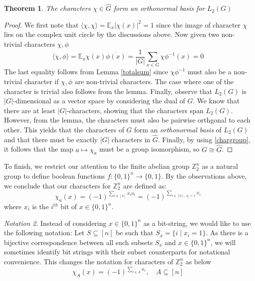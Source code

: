\documentclass{amsart}
\newtheorem{theorem}{Theorem}[section]
\theoremstyle{definition}
\theoremstyle{remark}
\numberwithin{equation}{section}
\theoremstyle{remark}
\newtheorem{notation}[theorem]{Notation}
\begin{document}
\begin{theorem} \label{orthonormal}
  The characters $\chi \in \hat{G}$ form an orthonormal basis for $L_2(G)$
\end{theorem}
%
\begin{proof}
We first note that $\langle \chi, \chi \rangle = \mathbb{E}_x|\chi(x)|^2 = 1$ since the image of character $\chi$ lies on the complex unit circle by the discussions above. Now given two non-trivial characters $\chi, \phi$
$$ \langle \chi, \phi \rangle = \mathbb{E}_x \chi(x)\overline{\phi(x)} = \frac{1}{|G|} \sum_{x \in G} \chi\phi^{-1}(x)  = 0$$
The last equality follows from Lemma \ref{totalsum} since $\chi\phi^{-1}$ must also be a non-trivial character if $\chi, \phi$ are non-trivial characters. The case where one of the character is trivial also follows from the lemma.
Finally, observe that $L_2(G)$ is $|G|$-dimensional as a vector space by considering the dual of $G$. We know that there are at least $|G|$-characters, showing that the characters span $L_2(G)$. However, from the lemma, the characters must also be pairwise orthgonal to each other. This yields that the characters of $G$ form an \emph{orthonormal basis} of $L_2(G)$ and that there must be exactly $|G|$ characters in $\hat{G}$. Finally, by using \ref{chargroup}, it follows that the map $a \mapsto \chi_a$ must be a group isomorphism, so $G \cong \hat{G}$.
\end{proof}

To finish, we restrict our attention to the finite abelian group $\mathbb{Z}_2^n$ as a natural group to define boolean functions $f: \{0,1\}^n \rightarrow \{0,1\}$. By the observations above, we conclude that our characters for $\mathbb{Z}_2^n$ are defined as:
%
\begin{equation}
  \chi_a(x) = (-1)^{\sum_{i \in [n]} x_ia_i} = (-1)^{\sum_{i \in [n], \; a_i = 1} x_i}
\end{equation}
where $x_i$ is the $i^{th}$ bit of $x \in \{0,1\}^n$.
%
\begin{notation}
  Instead of considering $x \in \{0,1\}^n$ as a bit-string, we would like to use the following notation: Let $S \subseteq [n]$ be such that $S_x = \{i \mid x_i = 1\}$. As there is a bijective correspondence between all such subsets $S_x$ and $x \in \{0,1\}^n$, we will sometimes identify bit strings with their subset counterparts for notational convenience. This changes the notation for characters of $\mathbb{Z}_2^n$ as below
  $$ \chi_A(x) = (-1)^{\sum_{i \in A} x_i}, \quad A \subseteq [n]$$
\end{notation}
\end{document}
